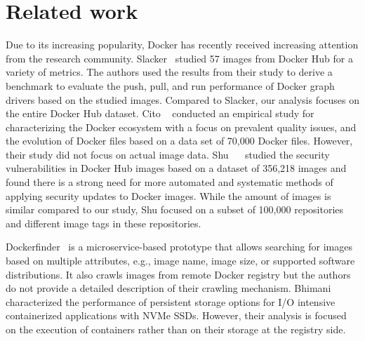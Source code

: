\section{Related work}
\label{sec:related}


Due to its increasing popularity, Docker has recently received increasing
attention from the research community.
%
Slacker~\cite{slacker} studied 57 images from Docker Hub for a variety of metrics.
The authors used the results from their study to derive a benchmark to evaluate
the push, pull, and run performance of Docker graph drivers based on the studied
images. Compared to Slacker, our analysis focuses on the entire Docker Hub dataset.
%
Cito \etal~\cite{analysisdockergithub} conducted an empirical study for characterizing
the Docker ecosystem with a focus on prevalent quality issues, and the evolution of Docker 
files based on a data set of 70,000 Docker files. However, their study did not focus
on actual image data.
%
Shu \etal~~\cite{dockervulnerabile} studied the security vulnerabilities in Docker Hub
images based on a dataset of 356,218 images and found there is a strong need for more
automated and systematic methods of applying security updates to Docker images. While
the amount of images is similar compared to our study, Shu \etal focused on a subset
of 100,000 repositories and different image tags in these repositories.

Dockerfinder~\cite{dockerfinder} is a microservice-based prototype that allows searching
for images based on  multiple attributes, e.g., image name, image size, or supported software 
distributions. It also crawls images from remote Docker registry but the authors do
not provide a detailed description of their crawling mechanism.
%
Bhimani~\cite{dockerssd} \etal characterized the performance of persistent storage options
for I/O intensive containerized applications with NVMe SSDs. However, their analysis is
focused on the execution of containers rather than on their storage at the registry side.

